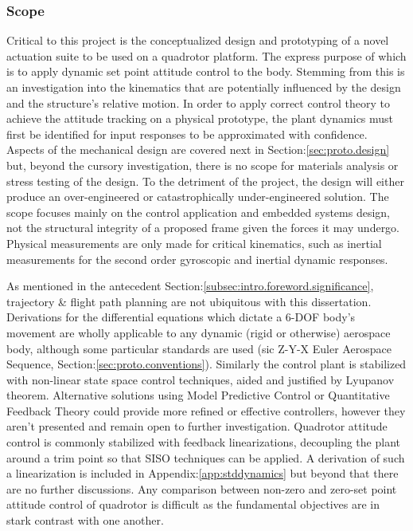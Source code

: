 \subsubsection{Scope}
\label{subsubsec:intro.foreword.scope}
Critical to this project is the conceptualized design and prototyping of a novel actuation suite to be used on a quadrotor platform. The express purpose of which is to apply dynamic set point attitude control to the body. Stemming from this is an investigation into the kinematics that are potentially influenced by the design and the structure's relative motion. In order to apply correct control theory to achieve the attitude tracking on a physical prototype, the plant dynamics must first be identified for input responses to be approximated with confidence. Aspects of the mechanical design are covered next in Section:\ref{sec:proto.design} but, beyond the cursory investigation, there is no scope for materials analysis or stress testing of the design. To the detriment of the project, the design will either produce an over-engineered or catastrophically under-engineered solution. The scope focuses mainly on the control application and embedded systems design, not the structural integrity of a proposed frame given the forces it may undergo. Physical measurements are only made for critical kinematics, such as inertial measurements for the second order gyroscopic and inertial dynamic responses.
\par
As mentioned in the antecedent Section:\ref{subsec:intro.foreword.significance}, trajectory \& flight path planning are not ubiquitous with this dissertation. Derivations for the differential equations which dictate a 6-DOF body's movement are wholly applicable to any dynamic (rigid or otherwise) aerospace body, although some particular standards are used (sic Z-Y-X Euler Aerospace Sequence, Section:\ref{sec:proto.conventions}). Similarly the control plant is stabilized with non-linear state space control techniques, aided and justified by Lyupanov theorem. Alternative solutions using Model Predictive Control or Quantitative Feedback Theory could provide more refined or effective controllers, however they aren't presented and remain open to further investigation. Quadrotor attitude control is commonly stabilized with feedback linearizations, decoupling the plant around a trim point so that SISO techniques can be applied. A derivation of such a linearization is included in Appendix:\ref{app:stddynamics} but beyond that there are no further discussions. Any comparison between non-zero and zero-set point attitude control of quadrotor is difficult as the fundamental objectives are in stark contrast with one another.

